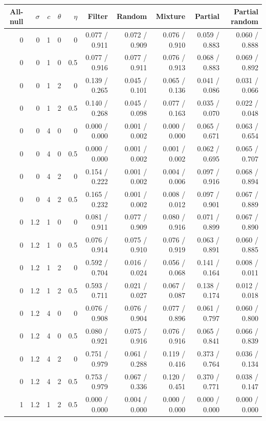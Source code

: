 \begin{tabular}{rrrrrrrrrr}\toprule
All-null & $\sigma$ & $c$ & $\theta$ & $\eta$ & Filter & Random & Mixture & Partial & Partial random\\\midrule
0 & 0 & 1 & 0 & 0 & 0.077 / 0.911 & 0.072 / 0.909 & 0.076 / 0.910 & 0.059 / 0.883 & 0.060 / 0.888 \\
0 & 0 & 1 & 0 & 0.5 & 0.077 / 0.916 & 0.077 / 0.911 & 0.076 / 0.913 & 0.068 / 0.883 & 0.069 / 0.892 \\
0 & 0 & 1 & 2 & 0 & 0.139 / 0.265 & 0.045 / 0.101 & 0.065 / 0.136 & 0.041 / 0.086 & 0.031 / 0.066 \\
0 & 0 & 1 & 2 & 0.5 & 0.140 / 0.268 & 0.045 / 0.098 & 0.077 / 0.163 & 0.035 / 0.070 & 0.022 / 0.048 \\
0 & 0 & 4 & 0 & 0 & 0.000 / 0.000 & 0.001 / 0.002 & 0.000 / 0.000 & 0.065 / 0.671 & 0.063 / 0.654 \\
0 & 0 & 4 & 0 & 0.5 & 0.000 / 0.000 & 0.001 / 0.002 & 0.001 / 0.002 & 0.062 / 0.695 & 0.065 / 0.707 \\
0 & 0 & 4 & 2 & 0 & 0.154 / 0.222 & 0.001 / 0.002 & 0.004 / 0.006 & 0.097 / 0.916 & 0.068 / 0.894 \\
0 & 0 & 4 & 2 & 0.5 & 0.165 / 0.232 & 0.001 / 0.002 & 0.008 / 0.012 & 0.097 / 0.901 & 0.067 / 0.889 \\
0 & 1.2 & 1 & 0 & 0 & 0.081 / 0.911 & 0.077 / 0.909 & 0.080 / 0.916 & 0.071 / 0.899 & 0.067 / 0.890 \\
0 & 1.2 & 1 & 0 & 0.5 & 0.076 / 0.914 & 0.075 / 0.910 & 0.076 / 0.919 & 0.063 / 0.891 & 0.060 / 0.885 \\
0 & 1.2 & 1 & 2 & 0 & 0.592 / 0.704 & 0.016 / 0.024 & 0.056 / 0.068 & 0.141 / 0.164 & 0.008 / 0.011 \\
0 & 1.2 & 1 & 2 & 0.5 & 0.593 / 0.711 & 0.021 / 0.027 & 0.067 / 0.087 & 0.138 / 0.174 & 0.012 / 0.018 \\
0 & 1.2 & 4 & 0 & 0 & 0.076 / 0.908 & 0.076 / 0.904 & 0.077 / 0.896 & 0.061 / 0.797 & 0.060 / 0.800 \\
0 & 1.2 & 4 & 0 & 0.5 & 0.080 / 0.921 & 0.075 / 0.916 & 0.076 / 0.916 & 0.065 / 0.841 & 0.066 / 0.839 \\
0 & 1.2 & 4 & 2 & 0 & 0.751 / 0.979 & 0.061 / 0.288 & 0.119 / 0.416 & 0.373 / 0.764 & 0.036 / 0.134 \\
0 & 1.2 & 4 & 2 & 0.5 & 0.753 / 0.979 & 0.067 / 0.336 & 0.120 / 0.451 & 0.370 / 0.771 & 0.038 / 0.147 \\
1 & 1.2 & 1 & 2 & 0.5 & 0.000 / 0.000 & 0.004 / 0.000 & 0.000 / 0.000 & 0.000 / 0.000 & 0.000 / 0.000 \\
\bottomrule\end{tabular}
